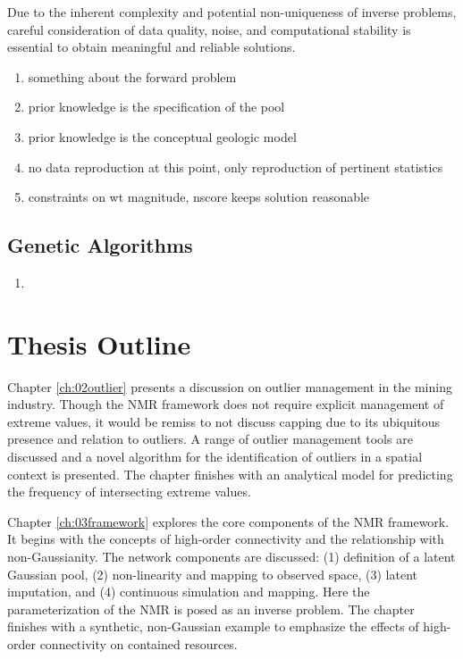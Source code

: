 Due to the inherent complexity and potential non-uniqueness of inverse problems, careful consideration of data quality, noise, and computational stability is essential to obtain meaningful and reliable solutions.

\begin{enumerate}
    \item something about the forward problem
    \item prior knowledge is the specification of the pool
    \item prior knowledge is the conceptual geologic model
    \item no data reproduction at this point, only reproduction of pertinent statistics
    \item constraints on wt magnitude, nscore keeps solution reasonable
\end{enumerate}


\FloatBarrier
\subsection{Genetic Algorithms}
\label{subsec:01genetic}

\begin{enumerate}
    \item \cite{price2013differential, georgioudakis2020comparative,bilal2020differential, piotrowski2017review, penunuri2016study, conn2009introduction, rios2013derivativefree}
\end{enumerate}

\FloatBarrier
\section{Thesis Outline}
\label{sec:01outline}

Chapter \ref{ch:02outlier} presents a discussion on outlier management in the mining industry. Though the \gls{NMR} framework does not require explicit management of extreme values, it would be remiss to not discuss capping due to its ubiquitous presence and relation to outliers. A range of outlier management tools are discussed and a novel algorithm for the identification of outliers in a spatial context is presented. The chapter finishes with an analytical model for predicting the frequency of intersecting extreme values.

Chapter \ref{ch:03framework} explores the core components of the \gls{NMR} framework. It begins with the concepts of high-order connectivity and the relationship with non-Gaussianity. The network components are discussed: (1) definition of a latent Gaussian pool, (2) non-linearity and mapping to observed space, (3) latent imputation, and (4) continuous simulation and mapping. Here the parameterization of the \gls{NMR} is posed as an inverse problem. The chapter finishes with a synthetic, non-Gaussian example to emphasize the effects of high-order connectivity on contained resources.

